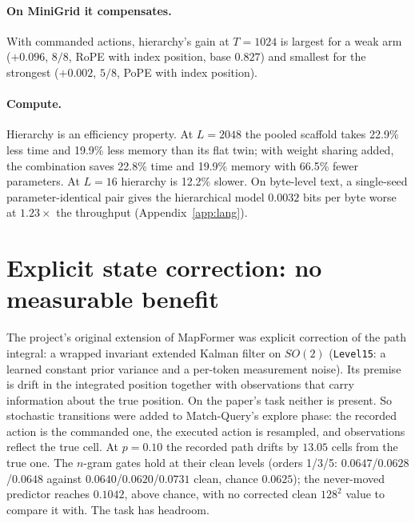\documentclass[10pt]{article}
\newcommand{\arm}[1]{\texttt{#1}}
\begin{document}
\paragraph{On MiniGrid it compensates.} With commanded actions, hierarchy's gain at $T=1024$ is largest for
a weak arm ($+0.096$, $8/8$, RoPE with index position, base $0.827$) and smallest for the strongest ($+0.002$, $5/8$,
PoPE with index position). %

\paragraph{Compute.} Hierarchy is an efficiency property. At $L=2048$ the pooled scaffold takes 22.9\% less
time and 19.9\% less memory than its flat twin; with weight sharing added, the combination saves 22.8\%
time and 19.9\% memory with 66.5\% fewer parameters. At $L=16$ hierarchy is 12.2\% slower. On byte-level
text, a single-seed parameter-identical pair gives the hierarchical model $0.0032$ bits per byte worse at
$1.23\times$ the throughput (Appendix~\ref{app:lang}). %

\section{Explicit state correction: no measurable benefit}
\label{sec:correction}

The project's original extension of MapFormer was explicit correction of the path integral: a wrapped
invariant extended Kalman filter on $SO(2)$ (\arm{Level15}: a learned constant prior variance and a
per-token measurement noise). Its premise is drift in the integrated position together with observations
that carry information about the true position. On the paper's task neither is present. So stochastic
transitions were added to Match-Query's explore phase: the recorded action is the commanded one, the
executed action is resampled, and observations reflect the true cell. At $p=0.10$ the recorded path drifts
by $13.05$ cells from the true one. The $n$-gram gates hold at their clean levels (orders 1/3/5:
$0.0647$/$0.0628$/$0.0648$ against $0.0640$/$0.0620$/$0.0731$ clean, chance $0.0625$); the never-moved predictor
reaches $0.1042$, above chance, with no corrected clean $128^2$ value to compare it with. The task has headroom.
\end{document}
